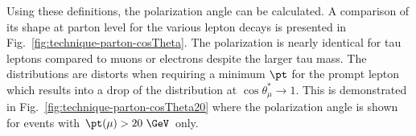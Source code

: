 
Using these definitions, the polarization angle can be calculated. A comparison of its shape at parton level for the various lepton decays is presented in Fig.~\ref{fig:technique-parton-cosTheta}. The polarization is nearly identical for tau leptons compared to muons or electrons despite the larger tau mass.  The distributions are distorts when requiring a minimum $\pt$ for the prompt lepton which results into a drop of the distribution at $\cos\theta^{*}_{\mu}\to 1$. This is demonstrated in Fig.~\ref{fig:technique-parton-cosTheta20} where the polarization angle is shown for events with $\pt(\mu)>20~\GeV$ only.


